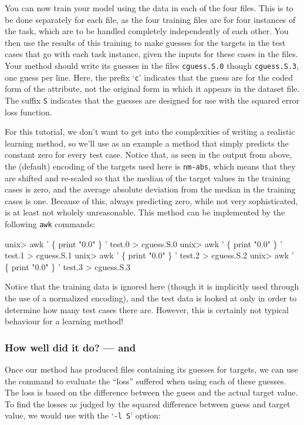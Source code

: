 You can now train your model using the data in each of the four
 files.  This is to be done separately for each file,
as the four training files are for four instances of the task, which
are to be handled completely independently of each other. You then use
the results of this training to make guesses for the targets in the
test cases that go with each task instance, given the inputs for these
cases in the  files.  Your method should write its
guesses in the files \texttt{cguess.S.0} though \texttt{cguess.S.3}, one
guess per line.  Here, the prefix `\texttt{c}' indicates that the
guess are for the coded form of the attribute, not the original form
in which it appears in the dataset file.  The suffix \texttt{S}
indicates that the guesses are designed for use with the squared error
loss function.

For this tutorial, we don't want to get into the complexities of
writing a realistic learning method, so we'll use as an example a
method that simply predicts the constant zero for every test case.
Notice that, as seen in the output from \minfo{} above, the (default)
encoding of the targets used here is \texttt{nm-abs}, which means that
they are shifted and re-scaled so that the median of the target values
in the training cases is zero, and the average absolute deviation from
the median in the training cases is one.  Because of this, always
predicting zero, while not very sophisticated, is at least not wholely
unreasonable.  This method can be implemented by the following
\texttt{awk} commands:

\begin{Session}
unix> awk ' \{ print "0.0" \} ' test.0 > cguess.S.0
unix> awk ' \{ print "0.0" \} ' test.1 > cguess.S.1
unix> awk ' \{ print "0.0" \} ' test.2 > cguess.S.2
unix> awk ' \{ print "0.0" \} ' test.3 > cguess.S.3
\end{Session}

Notice that the training data is ignored here (though it is implicitly
used through the use of a normalized encoding), and the test data is
looked at only in order to determine how many test cases there are.
However, this is certainly not typical behaviour for a learning
method!


\subsubsection*{How well did it do? --- \mloss{} and \mstats{}}

Once our method has produced  files containing its
guesses for targets, we can use the \mloss{} command to evaluate the
``loss'' suffered when using each of these guesses.  The loss is based
on the difference between the guess and the actual target value.  To
find the losses as judged by the squared difference between guess and
target value, we would use \mloss{} with the `\texttt{-l S}' option:

